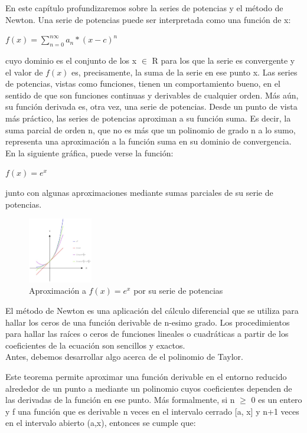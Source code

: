 En este capítulo profundizaremos sobre la series de potencias y el método de Newton. 
Una serie de potencias puede ser interpretada como una función de x: \\

\centerline{ $ f(x) = \sum_{n=0}^{n\infty} a_n *(x-c)^n $}

cuyo dominio es el conjunto de los x $\in$ R para los que la serie es convergente y el valor de $ f(x) $ es, precisamente, la suma de la serie en ese punto x.
Las series de potencias, vistas como funciones, tienen un comportamiento bueno, en el sentido de que son funciones continuas y derivables de cualquier orden.  Más aún, su función derivada es, otra vez, una serie de potencias.
Desde un punto de vista más práctico, las series de potencias aproximan a su función suma. Es decir, la suma parcial de orden n, que no es más que un polinomio de grado n a lo sumo, representa una aproximación a la
función suma en su dominio de convergencia. En la siguiente gráfica, puede verse la función:

\centerline{ $ f(x) = e^x$}


junto con algunas aproximaciones mediante sumas parciales de su serie de potencias.


\begin{figure}[!th]
\begin{center}
\includegraphics[width=0.25\textwidth]{images/serie_de_potencias_2.eps}
\caption{Aproximación a $f(x)=e^x $ por su serie de potencias}
\end{center}
\end{figure}

El método de Newton es una aplicación del cálculo diferencial que se utiliza para hallar los ceros de una función derivable de n-esimo grado.
Los procedimientos para hallar las raíces o ceros de funciones lineales o cuadráticas a partir de los coeficientes de la ecuación son sencillos y exactos.\\

Antes, debemos desarrollar algo acerca de el polinomio de Taylor.

Este teorema permite aproximar una función derivable en el entorno reducido alrededor de un punto a  mediante un polinomio cuyos coeficientes dependen de las derivadas de la función en ese punto. 
Más formalmente, si  n $\geq$ 0 es un entero y f una función que es derivable n veces en el intervalo cerrado [a, x] y n+1 veces en el intervalo abierto (a,x), entonces se cumple que:\\


